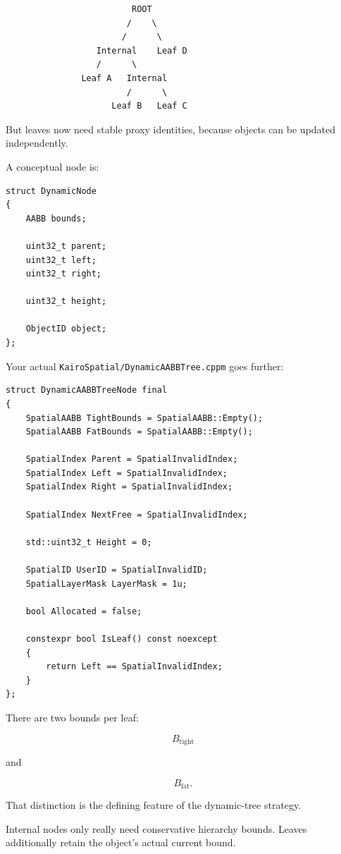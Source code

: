\begin{verbatim}
                         ROOT
                        /    \
                       /      \
                  Internal    Leaf D
                  /      \
               Leaf A   Internal
                        /      \
                     Leaf B   Leaf C
\end{verbatim}

But leaves now need stable proxy identities, because objects can be updated independently.

A conceptual node is:

\begin{verbatim}
struct DynamicNode
{
    AABB bounds;

    uint32_t parent;
    uint32_t left;
    uint32_t right;

    uint32_t height;

    ObjectID object;
};
\end{verbatim}

Your actual \texttt{KairoSpatial/DynamicAABBTree.cppm} goes further:

\begin{verbatim}
struct DynamicAABBTreeNode final
{
    SpatialAABB TightBounds = SpatialAABB::Empty();
    SpatialAABB FatBounds = SpatialAABB::Empty();

    SpatialIndex Parent = SpatialInvalidIndex;
    SpatialIndex Left = SpatialInvalidIndex;
    SpatialIndex Right = SpatialInvalidIndex;

    SpatialIndex NextFree = SpatialInvalidIndex;

    std::uint32_t Height = 0;

    SpatialID UserID = SpatialInvalidID;
    SpatialLayerMask LayerMask = 1u;

    bool Allocated = false;

    constexpr bool IsLeaf() const noexcept
    {
        return Left == SpatialInvalidIndex;
    }
};
\end{verbatim}

There are two bounds per leaf:

\[
B_{\text{tight}}
\]

and

\[
B_{\text{fat}}.
\]

That distinction is the defining feature of the dynamic-tree strategy.

Internal nodes only really need conservative hierarchy bounds. Leaves additionally retain the object's actual current bound.

